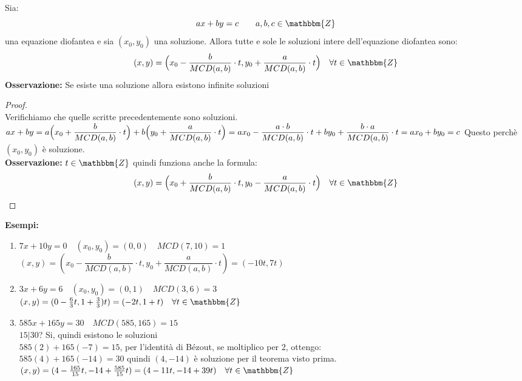 \documentclass[12pt, letterpaper]{report}
\newcounter{theorem}
\begin{document}
			\begin{theorem}{}{}
				Sia:
				\[
				ax + by = c \quad \quad a,b,c \in \mathbbm{Z}
				\]
				una equazione diofantea e sia $(x_0, y_0)$ una soluzione. Allora tutte e sole le soluzioni intere dell'equazione diofantea sono:
				\[
				(x,y) = \Bigl(x_0 - \dfrac{b}{MCD(a,b)} \cdot t, y_0 + \dfrac{a}{MCD(a,b)} \cdot t\Bigr) \quad \forall t \in \mathbbm{Z}
				\]
				\textbf{Osservazione:} Se esiste una soluzione allora esistono infinite soluzioni
				\begin{proof} \quad \\
					Verifichiamo che quelle scritte precedentemente sono soluzioni. \\
					$
					ax + by = a\Bigl(x_0 + \dfrac{b}{MCD(a,b)} \cdot t\Bigr) + b\Bigl(y_0 + \dfrac{a}{MCD(a,b)} \cdot t\Bigr)
					\\ = ax_0 - \dfrac{a \cdot b}{MCD(a,b)} \cdot t + by_0 + \dfrac{b \cdot a}{MCD(a,b)} \cdot t \\
					= ax_0 + by_0 = c
					$
					Questo perchè $(x_0,y_0)$ è soluzione. \\
					\textbf{Osservazione:} $t \in \mathbbm{Z}$ quindi funziona anche la formula:
					\[
					(x,y) = \Bigl(x_0 + \dfrac{b}{MCD(a,b)} \cdot t, y_0 - \dfrac{a}{MCD(a,b)} \cdot t\Bigr) \quad \forall t \in \mathbbm{Z}
					\]
				\end{proof}
			\end{theorem}
			\textbf{Esempi:}
			\begin{enumerate}
				\item $7x + 10y = 0 \quad (x_0, y_0) = (0, 0) \quad MCD(7,10) = 1$ \\
				$(x,y) = (x_0 - \dfrac{b}{MCD(a,b)} \cdot t, y_0 + \dfrac{a}{MCD(a,b)} \cdot t) = (-10t, 7t)$
				\item $3x + 6y = 6 \quad (x_0, y_0) = (0,1) \quad MCD(3, 6) = 3$ \\
				$(x, y) = (0 - \frac{6}{3}t, 1 + \frac{3}{3})t) = (-2t, 1 + t) \quad \forall t \in \mathbbm{Z}$
				\item $585x + 165y = 30 \quad MCD(585, 165) = 15$ \\
				$15|30$? Si, quindi esistono le soluzioni \\
				$585(2) + 165(-7) = 15$, per l'identità di Bézout, se moltiplico per 2, ottengo: \\
				$585(4) + 165(-14) = 30$ quindi $(4,-14)$ è soluzione per il teorema visto prima. \\
				$(x,y) = (4 - \frac{165}{15}t, -14 + \frac{585}{15}t) = (4 - 11t, -14 + 39t) \quad \forall t \in \mathbbm{Z}$
			\end{enumerate}
\end{document}
